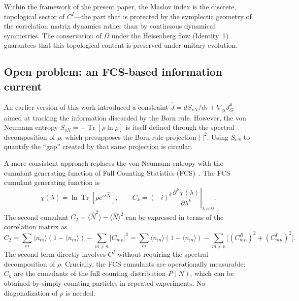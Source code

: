 \documentclass[aps,pra,preprint,groupedaddress,amsmath,amssymb,floatfix]{revtex4-2}
\begin{document}
Within the framework of the present paper, the Maslov index is the discrete, topological sector of $C^I$---the part that is protected by the symplectic geometry of the correlation matrix dynamics rather than by continuous dynamical symmetries. The conservation of $\Omega$ under the Heisenberg flow (Identity~1) guarantees that this topological content is preserved under unitary evolution.

\subsection{Open problem: an FCS-based information current}

An earlier version of this work introduced a constraint $\hat{J} = dS_{vN}/d\tau + \nabla_\mu J^\mu_G$ aimed at tracking the information discarded by the Born rule. However, the von Neumann entropy $S_{vN} = -\operatorname{Tr}[\rho \ln \rho]$ is itself defined through the spectral decomposition of $\rho$, which presupposes the Born rule projection $|\cdot|^2$. Using $S_{vN}$ to quantify the ``gap'' created by that same projection is circular.

A more consistent approach replaces the von Neumann entropy with the cumulant generating function of Full Counting Statistics (FCS)~\cite{levitov1993,levitov1996}. The FCS cumulant generating function is
\begin{equation}
\chi(\lambda) = \ln \operatorname{Tr}[\rho e^{i\lambda \hat{N}}],
\qquad
C_k = (-i)^k \left. \frac{\partial^k \chi(\lambda)}{\partial \lambda^k} \right|_{\lambda = 0}.
\end{equation}
The second cumulant $C_2 = \langle \hat{N}^2 \rangle - \langle \hat{N} \rangle^2$ can be expressed in terms of the correlation matrix as
\begin{equation}
C_2 = \sum_m \langle n_m \rangle (1 - \langle n_m \rangle) - \sum_{m \neq n} |C_{mn}|^2
= \sum_m \langle n_m \rangle (1 - \langle n_m \rangle) - \sum_{m \neq n} \bigl[ (C^R_{mn})^2 + (C^I_{mn})^2 \bigr].
\end{equation}
The second term directly involves $C^I$ without requiring the spectral decomposition of $\rho$. Crucially, the FCS cumulants are operationally measurable: $C_k$ are the cumulants of the full counting distribution $P(N)$, which can be obtained by simply counting particles in repeated experiments. No diagonalization of $\rho$ is needed.
\end{document}
